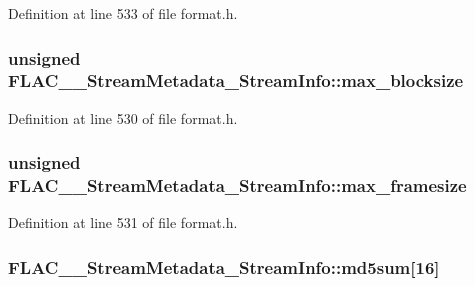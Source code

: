 Definition at line 533 of file format.\+h.

\subsubsection[{\texorpdfstring{max\+\_\+blocksize}{max_blocksize}}]{\setlength{\rightskip}{0pt plus 5cm}unsigned F\+L\+A\+C\+\_\+\+\_\+\+Stream\+Metadata\+\_\+\+Stream\+Info\+::max\+\_\+blocksize}\hypertarget{struct_f_l_a_c_____stream_metadata___stream_info_a0eda0a30574e0b51716f34c6a90912dc}{}\label{struct_f_l_a_c_____stream_metadata___stream_info_a0eda0a30574e0b51716f34c6a90912dc}


Definition at line 530 of file format.\+h.

\subsubsection[{\texorpdfstring{max\+\_\+framesize}{max_framesize}}]{\setlength{\rightskip}{0pt plus 5cm}unsigned F\+L\+A\+C\+\_\+\+\_\+\+Stream\+Metadata\+\_\+\+Stream\+Info\+::max\+\_\+framesize}\hypertarget{struct_f_l_a_c_____stream_metadata___stream_info_a89e04506e5030310582fed83b9a36022}{}\label{struct_f_l_a_c_____stream_metadata___stream_info_a89e04506e5030310582fed83b9a36022}


Definition at line 531 of file format.\+h.

\subsubsection[{\texorpdfstring{md5sum}{md5sum}}]{ F\+L\+A\+C\+\_\+\+\_\+\+Stream\+Metadata\+\_\+\+Stream\+Info\+::md5sum\mbox{[}16\mbox{]}}\hypertarget{struct_f_l_a_c_____stream_metadata___stream_info_ac9cd72dc89ed697f78e8521fb69d232f}{}\label{struct_f_l_a_c_____stream_metadata___stream_info_ac9cd72dc89ed697f78e8521fb69d232f}


